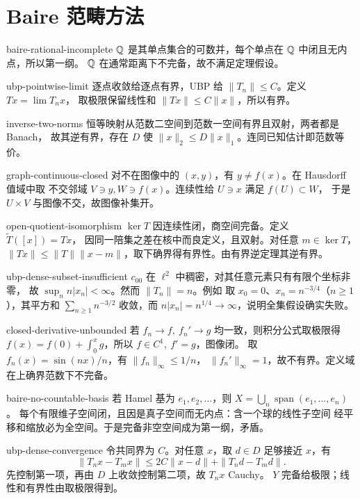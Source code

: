 \chapter{Baire 范畴方法}
\begin{solution}{baire-rational-incomplete}
\(\mathbb{Q}\) 是其单点集合的可数并，每个单点在 \(\mathbb{Q}\) 中闭且无内点，所以第一纲。
\(\mathbb{Q}\) 在通常距离下不完备，故不满足定理假设。
\end{solution}
\begin{solution}{ubp-pointwise-limit}
逐点收敛给逐点有界，UBP 给 \(\|T_n\|\le C\)。定义 \(Tx=\lim T_nx\)，
取极限保留线性和 \(\|Tx\|\le C\|x\|\)，所以有界。
\end{solution}
\begin{solution}{inverse-two-norms}
恒等映射从范数二空间到范数一空间有界且双射，两者都是 Banach，
故其逆有界，存在 \(D\) 使 \(\|x\|_2\le D\|x\|_1\)。连同已知估计即范数等价。
\end{solution}
\begin{solution}{graph-continuous-closed}
对不在图像中的 \((x,y)\)，有 \(y\ne f(x)\)。在 Hausdorff 值域中取
不交邻域 \(V\ni y,W\ni f(x)\)。连续性给 \(U\ni x\) 满足 \(f(U)\subset W\)，
于是 \(U\times V\) 与图像不交，故图像补集开。
\end{solution}
\begin{solution}{open-quotient-isomorphism}
\(\ker T\) 因连续性闭，商空间完备。定义 \(\widetilde T([x])=Tx\)，
因同一陪集之差在核中而良定义，且双射。对任意 \(m\in\ker T\)，
\(\|Tx\|\le\|T\|\|x-m\|\)，取下确界得有界性。由有界逆定理其逆有界。
\end{solution}
\begin{solution}{ubp-dense-subset-insufficient}
\(c_{00}\) 在 \(\ell^2\) 中稠密，对其任意元素只有有限个坐标非零，
故 \(\sup_n n|x_n|<\infty\)。然而 \(\|T_n\|=n\)。例如
取 \(x_0=0\)、\(x_n=n^{-3/4}\)（\(n\ge1\)），其平方和
\(\sum_{n\ge1}n^{-3/2}\) 收敛，而 \(n|x_n|=n^{1/4}\to\infty\)，说明全集假设确实失败。
\end{solution}
\begin{solution}{closed-derivative-unbounded}
若 \(f_n\to f,\ f_n'\to g\) 均一致，则积分公式取极限得
\(f(x)=f(0)+\int_0^xg\)，所以 \(f\in C^1,\ f'=g\)，图像闭。
取 \(f_n(x)=\sin(nx)/n\)，有 \(\|f_n\|_\infty\le1/n\)，
\(\|f_n'\|_\infty=1\)，故不有界。定义域在上确界范数下不完备。
\end{solution}
\begin{solution}{baire-no-countable-basis}
若 Hamel 基为 \(e_1,e_2,\ldots\)，则 \(X=\bigcup_n\operatorname{span}(e_1,\ldots,e_n)\)。
每个有限维子空间闭，且因是真子空间而无内点：含一个球的线性子空间
经平移和缩放必为全空间。于是完备非空空间成为第一纲，矛盾。
\end{solution}
\begin{solution}{ubp-dense-convergence}
令共同界为 \(C\)。对任意 \(x\)，取 \(d\in D\) 足够接近 \(x\)，有
\[
 \|T_nx-T_mx\|\le2C\|x-d\|+\|T_nd-T_md\|.
\]
先控制第一项，再由 \(D\) 上收敛控制第二项，故 \(T_nx\) Cauchy。
\(Y\) 完备给极限；线性和有界性由取极限得到。
\end{solution}
